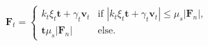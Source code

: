 \begin{equation}
\mathbf{F}_t = 
 \begin{cases}
k_t \xi_t \mathbf{t} + \gamma_t \mathbf{v}_t  & \text{if } |k_t \xi_t \mathbf{t}
+ \gamma_t \mathbf{v}_t| \leq \mu_s |\mathbf{F}_n| ,\\
\mathbf{t} \mu_s |\mathbf{F}_n|  & \text{else.}
\end{cases}
 \label{eq:ft}
\end{equation}
